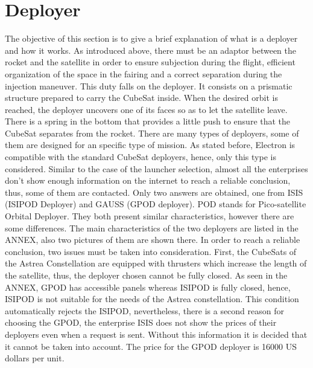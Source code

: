 \section{Deployer}
The objective of this section is to give a brief explanation of what is a deployer and how it works. 
As introduced above, there must be an adaptor between the rocket and the satellite in order to ensure subjection during the flight, efficient organization of the space in the fairing and a correct separation during the injection maneuver. This duty falls on the deployer. It consists on a prismatic structure prepared to carry the CubeSat inside. When the desired orbit is reached, the deployer uncovers one of its faces so as to let the satellite leave. There is a spring in the bottom that provides a little push to ensure that the CubeSat separates from the rocket. 
There are many types of deployers, some of them are designed for an specific type of mission. As stated before, Electron is compatible with the standard CubeSat deployers, hence, only this type is considered. Similar to the case of the launcher selection, almost all the enterprises don't show enough information on the internet to reach a reliable conclusion, thus, some of them are contacted. Only two answers are obtained, one from ISIS (ISIPOD Deployer) and GAUSS (GPOD deployer). POD stands for Pico-satellite Orbital Deployer. 
\newline
They both present similar characteristics, however there are some differences. The main characteristics of the two deployers are listed in the ANNEX, also two pictures of them are shown there.
In order to reach a reliable conclusion, two issues must be taken into consideration. First, the CubeSats of the Astrea Constellation are equipped with thrusters which increase the length of the satellite, thus, the deployer chosen cannot be fully closed. As seen in the ANNEX, GPOD has accessible panels whereas ISIPOD is fully closed, hence, ISIPOD is not suitable for the needs of the Astrea constellation. This condition automatically rejects the ISIPOD, nevertheless, there is a second reason for choosing the GPOD, the enterprise ISIS does not show the prices of their deployers even when a request is sent. Without this information it is decided that it cannot be taken into account. The price for the GPOD  deployer is 16000 US dollars per unit. 




